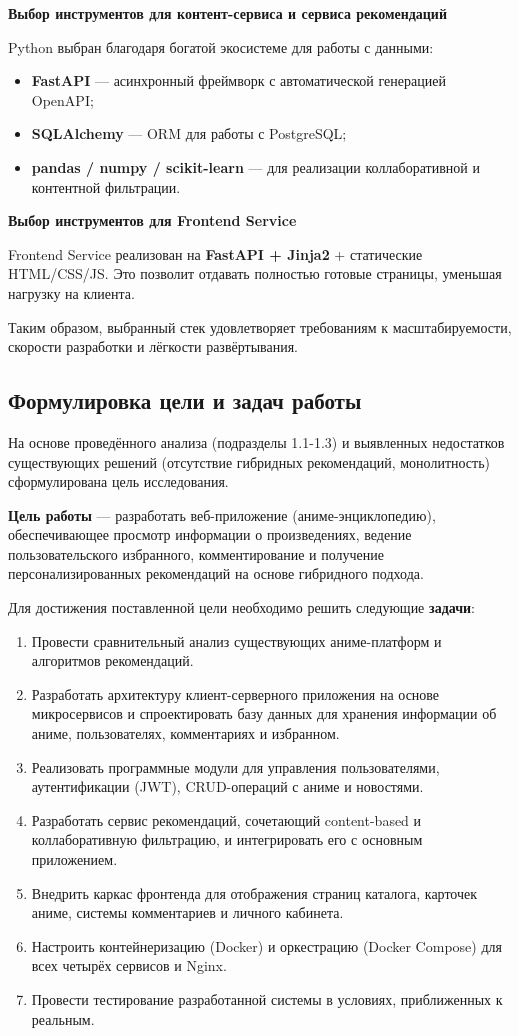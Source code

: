 \textbf{Выбор инструментов для контент-сервиса и сервиса рекомендаций}

Python выбран благодаря богатой экосистеме для работы с данными:
\begin{itemize}
	\item \textbf{FastAPI} — асинхронный фреймворк с автоматической генерацией OpenAPI;
	\item \textbf{SQLAlchemy} — ORM для работы с PostgreSQL;
	\item \textbf{pandas / numpy / scikit-learn} — для реализации коллаборативной и контентной фильтрации.
\end{itemize}

\textbf{Выбор инструментов для Frontend Service}

Frontend Service реализован на \textbf{FastAPI + Jinja2} + статические HTML/CSS/JS. Это позволит отдавать полностью готовые страницы, уменьшая нагрузку на клиента.

Таким образом, выбранный стек удовлетворяет требованиям к масштабируемости, скорости разработки и лёгкости развёртывания.
\\
\subsection{Формулировка цели и задач работы}

На основе проведённого анализа (подразделы 1.1-1.3) и выявленных недостатков существующих решений (отсутствие гибридных рекомендаций, монолитность) сформулирована цель исследования.

\textbf{Цель работы} — разработать веб-приложение (аниме-энциклопедию), обеспечивающее просмотр информации о произведениях, ведение пользовательского избранного, комментирование и получение персонализированных рекомендаций на основе гибридного подхода.

Для достижения поставленной цели необходимо решить следующие \textbf{задачи}:
\begin{enumerate}
	\item Провести сравнительный анализ существующих аниме-платформ и алгоритмов рекомендаций.
	\item Разработать архитектуру клиент-серверного приложения на основе микросервисов и спроектировать базу данных для хранения информации об аниме, пользователях, комментариях и избранном.
	\item Реализовать программные модули для управления пользователями, аутентификации (JWT), CRUD-операций с аниме и новостями.
	\item Разработать сервис рекомендаций, сочетающий content-based и коллаборативную фильтрацию, и интегрировать его с основным приложением.
	\item Внедрить каркас фронтенда для отображения страниц каталога, карточек аниме, системы комментариев и личного кабинета.
	\item Настроить контейнеризацию (Docker) и оркестрацию (Docker Compose) для всех четырёх сервисов и Nginx.
	\item Провести тестирование разработанной системы в условиях, приближенных к реальным.
\end{enumerate}